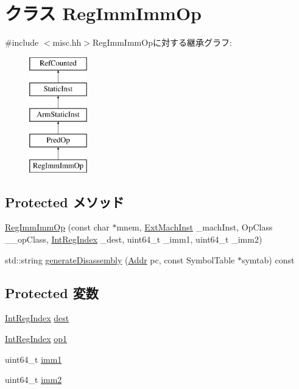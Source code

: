 \hypertarget{classRegImmImmOp}{
\section{クラス RegImmImmOp}
\label{classRegImmImmOp}
}


{\ttfamily \#include $<$misc.hh$>$}RegImmImmOpに対する継承グラフ:\begin{figure}[H]
\begin{center}
\leavevmode
\includegraphics[height=5cm]{classRegImmImmOp}
\end{center}
\end{figure}
\subsection*{Protected メソッド}
\begin{DoxyCompactItemize}
\item 
\hyperlink{classRegImmImmOp_a7b25d52adf1128abfb4080ae20595e60}{RegImmImmOp} (const char $\ast$mnem, \hyperlink{classStaticInst_a5605d4fc727eae9e595325c90c0ec108}{ExtMachInst} \_\-machInst, OpClass \_\-\_\-opClass, \hyperlink{namespaceArmISA_ae64680ba9fb526106829d6bf92fc791b}{IntRegIndex} \_\-dest, uint64\_\-t \_\-imm1, uint64\_\-t \_\-imm2)
\item 
std::string \hyperlink{classRegImmImmOp_a95d323a22a5f07e14d6b4c9385a91896}{generateDisassembly} (\hyperlink{classm5_1_1params_1_1Addr}{Addr} pc, const SymbolTable $\ast$symtab) const 
\end{DoxyCompactItemize}
\subsection*{Protected 変数}
\begin{DoxyCompactItemize}
\item 
\hyperlink{namespaceArmISA_ae64680ba9fb526106829d6bf92fc791b}{IntRegIndex} \hyperlink{classRegImmImmOp_aec72e8e45bdc87abeeeb75d2a8a9a716}{dest}
\item 
\hyperlink{namespaceArmISA_ae64680ba9fb526106829d6bf92fc791b}{IntRegIndex} \hyperlink{classRegImmImmOp_a4c465c43ad568f8bcf8ae71480e9cfea}{op1}
\item 
uint64\_\-t \hyperlink{classRegImmImmOp_a846a1153344f66cc5d7c5af6fc071bb4}{imm1}
\item 
uint64\_\-t \hyperlink{classRegImmImmOp_a4b3bca3d7461f9d143e9bcd456390a27}{imm2}
\end{DoxyCompactItemize}


